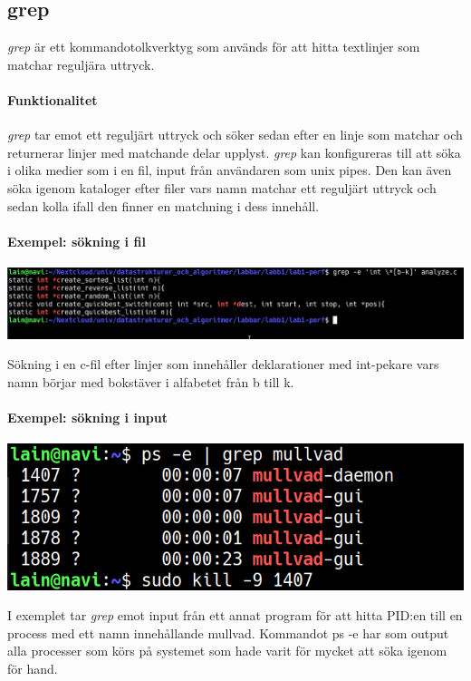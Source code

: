 \subsection{grep}
\emph{grep} är ett kommandotolkverktyg som används för att hitta textlinjer som matchar reguljära uttryck. 
\paragraph{Funktionalitet}
\emph{grep} tar emot ett reguljärt uttryck och söker sedan efter en linje som matchar och returnerar linjer med matchande delar upplyst. \emph{grep} kan konfigureras till att söka i olika medier som i en fil, input från användaren som unix pipes. Den kan även söka igenom kataloger efter filer vars namn matchar ett reguljärt uttryck och sedan kolla ifall den finner en matchning i dess innehåll.
\paragraph{Exempel: sökning i fil}
\begin{center}
        \includegraphics[width=\linewidth]{bilder/grep_sok_i_fil.png}
\end{center}
Sökning i en c-fil efter linjer som innehåller deklarationer med int-pekare vars namn börjar med bokstäver i alfabetet från b till k.
\paragraph{Exempel: sökning i input}
\begin{center}
        \includegraphics[width=\linewidth]{bilder/grep_pipes.png}
\end{center}
I exemplet tar \emph{grep} emot input från ett annat program för att hitta PID:en till en process med ett namn innehållande mullvad. Kommandot ps -e har som output alla processer som körs på systemet som hade varit för mycket att söka igenom för hand.
